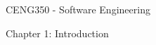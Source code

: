 \documentclass[a4paper]{article}
\begin{document}
\begin{center}
{\Huge{CENG350 - Software Engineering}}
\end{center}
\begin{LARGE}
Chapter 1: Introduction
\end{LARGE}
\end{document}
